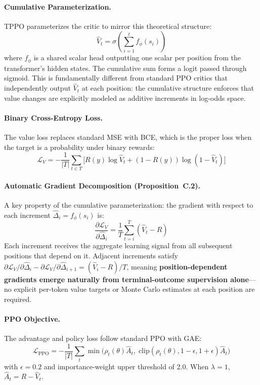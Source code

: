 \documentclass[11pt,a4paper]{article}
\begin{document}
\paragraph{Cumulative Parameterization.}
TPPO parameterizes the critic to mirror this theoretical structure:
\begin{equation}
\hat{V}_t = \sigma\!\left(\sum_{i=1}^{t} f_\phi(s_i)\right)
\end{equation}
where $f_\phi$ is a shared scalar head outputting one scalar per position from the transformer's hidden states. The cumulative sum forms a logit passed through sigmoid. This is fundamentally different from standard PPO critics that independently output $\hat{V}_t$ at each position: the cumulative structure enforces that value changes are explicitly modeled as additive increments in log-odds space.

\paragraph{Binary Cross-Entropy Loss.}
The value loss replaces standard MSE with BCE, which is the proper loss when the target is a probability under binary rewards:
\begin{equation}
\mathcal{L}_V = -\frac{1}{|T|}\sum_{t \in T}\bigl[R(y)\log \hat{V}_t + (1 - R(y))\log(1 - \hat{V}_t)\bigr]
\end{equation}

\paragraph{Automatic Gradient Decomposition (Proposition~C.2).}
A key property of the cumulative parameterization: the gradient with respect to each increment $\hat{\Delta}_i = f_\phi(s_i)$ is:
\begin{equation}
\frac{\partial \mathcal{L}_V}{\partial \hat{\Delta}_i} = \frac{1}{T}\sum_{t=i}^{T}(\hat{V}_t - R)
\end{equation}
Each increment receives the aggregate learning signal from all subsequent positions that depend on it. Adjacent increments satisfy $\partial\mathcal{L}_V/\partial\hat{\Delta}_i - \partial\mathcal{L}_V/\partial\hat{\Delta}_{i+1} = (\hat{V}_i - R)/T$, meaning \textbf{position-dependent gradients emerge naturally from terminal-outcome supervision alone}---no explicit per-token value targets or Monte Carlo estimates at each position are required.

\paragraph{PPO Objective.}
The advantage and policy loss follow standard PPO with GAE:
\begin{equation}
\mathcal{L}_{\text{PPO}} = -\frac{1}{|T|}\sum_t \min\!\bigl(\rho_t(\theta)\hat{A}_t,\; \text{clip}(\rho_t(\theta), 1{-}\epsilon, 1{+}\epsilon)\hat{A}_t\bigr)
\end{equation}
with $\epsilon{=}0.2$ and importance-weight upper threshold of 2.0. When $\lambda{=}1$, $\hat{A}_t = R - \hat{V}_t$.
\end{document}
